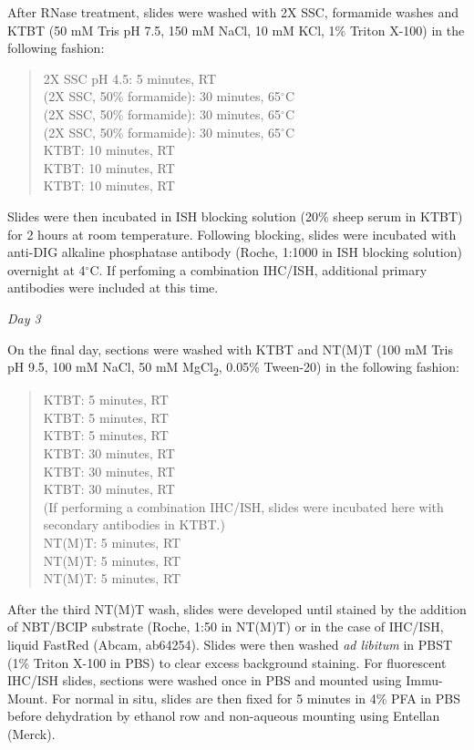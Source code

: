 \documentclass[onehalf,12pt]{beavtex}
\begin{document}
  After RNase treatment, slides were washed with 2X SSC, formamide washes
  and KTBT (50 mM Tris pH 7.5, 150 mM NaCl, 10 mM KCl, 1\% Triton X-100)
  in the following fashion:
  
  \begin{quote}
  2X SSC pH 4.5: 5 minutes, RT\\
  (2X SSC, 50\% formamide): 30 minutes, 65\(^\circ\)C\\
  (2X SSC, 50\% formamide): 30 minutes, 65\(^\circ\)C\\
  (2X SSC, 50\% formamide): 30 minutes, 65\(^\circ\)C\\
  KTBT: 10 minutes, RT\\
  KTBT: 10 minutes, RT\\
  KTBT: 10 minutes, RT
  \end{quote}
  
  Slides were then incubated in ISH blocking solution (20\% sheep serum in
  KTBT) for 2 hours at room temperature. Following blocking, slides were
  incubated with anti-DIG alkaline phosphatase antibody (Roche, 1:1000 in
  ISH blocking solution) overnight at 4\(^\circ\)C. If perfoming a
  combination IHC/ISH, additional primary antibodies were included at this
  time.
  
  \emph{Day 3}
  
  On the final day, sections were washed with KTBT and NT(M)T (100 mM Tris
  pH 9.5, 100 mM NaCl, 50 mM MgCl\textsubscript{2}, 0.05\% Tween-20) in
  the following fashion:
  
  \begin{quote}
  KTBT: 5 minutes, RT\\
  KTBT: 5 minutes, RT\\
  KTBT: 5 minutes, RT\\
  KTBT: 30 minutes, RT\\
  KTBT: 30 minutes, RT\\
  KTBT: 30 minutes, RT\\
  (If performing a combination IHC/ISH, slides were incubated here with
  secondary antibodies in KTBT.)\\
  NT(M)T: 5 minutes, RT\\
  NT(M)T: 5 minutes, RT\\
  NT(M)T: 5 minutes, RT
  \end{quote}
  
  After the third NT(M)T wash, slides were developed until stained by the
  addition of NBT/BCIP substrate (Roche, 1:50 in NT(M)T) or in the case of
  IHC/ISH, liquid FastRed (Abcam, ab64254). Slides were then washed
  \emph{ad libitum} in PBST (1\% Triton X-100 in PBS) to clear excess
  background staining. For fluorescent IHC/ISH slides, sections were
  washed once in PBS and mounted using Immu-Mount. For normal in situ,
  slides are then fixed for 5 minutes in 4\% PFA in PBS before dehydration
  by ethanol row and non-aqueous mounting using Entellan (Merck).
  
\end{document}
